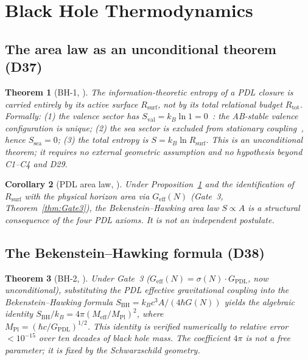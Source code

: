 \documentclass[11pt,a4paper]{article}
\theoremstyle{plain}
\newtheorem{theorem}{Theorem}[section]
\newtheorem{corollary}[theorem]{Corollary}
\theoremstyle{definition}
\theoremstyle{remark}
\newcommand{\Geff}{G_{\mathrm{eff}}}
\newcommand{\GPDL}{G_{\mathrm{PDL}}}
\newcommand{\Rsurf}{R_{\mathrm{surf}}}
\newcommand{\Rtot}{R_{\mathrm{tot}}}
\newcommand{\sigmaN}{\sigma(N)}
\newcommand{\SBH}{S_{\mathrm{BH}}}
\newcommand{\Meff}{M_{\mathrm{eff}}}
\newcommand{\MPl}{M_{\mathrm{Pl}}}
\begin{document}
\section{Black Hole Thermodynamics}
\label{sec:bh}

\subsection{The area law as an unconditional theorem (D37)}
\label{subsec:bharea}
\begin{theorem}[BH-1, \cite{D37}]
\label{thm:BH1}
The information-theoretic entropy of a PDL closure is carried entirely by its active surface $\Rsurf$, not by its total relational budget $\Rtot$. Formally: (1) the valence sector has $S_{\mathrm{val}}=k_B\ln 1=0$~\cite{D29}: the AB-stable valence configuration is unique; (2) the sea sector is excluded from stationary coupling~\cite{D29}, hence $S_{\mathrm{sea}}=0$; (3) the total entropy is $S=k_B\ln\Rsurf$. This is an unconditional theorem; it requires no external geometric assumption and no hypothesis beyond C1--C4 and D29.
\end{theorem}

\begin{corollary}[PDL area law, \cite{D37}]
\label{cor:arealaw}
Under Proposition~\ref{thm:BH1} and the identification of $\Rsurf$ with the physical horizon area via $\Geff(N)$ (Gate~3, Theorem~\ref{thm:Gate3}), the Bekenstein--Hawking area law $S\propto A$ is a structural consequence of the four PDL axioms. It is not an independent postulate.
\end{corollary}

\subsection{The Bekenstein--Hawking formula (D38)}
\label{subsec:bhformula}
\begin{theorem}[BH-2, \cite{D38}]
\label{thm:BH2}
Under Gate~3 ($G_{\mathrm{eff}}(N)=\sigmaN\cdot\GPDL$, now unconditional), substituting the PDL effective gravitational coupling into the Bekenstein--Hawking formula $\SBH=k_Bc^3A/(4\hbar G(N))$ yields the algebraic identity $\SBH/k_B=4\pi(\Meff/\MPl)^2$, where \\ $\MPl=(\hbar c/G_{\mathrm{PDL}})^{1/2}$. This identity is verified numerically to relative error $<10^{-15}$ over ten decades of black hole mass. The coefficient $4\pi$ is not a free parameter; it is fixed by the Schwarzschild geometry.
\end{theorem}
\end{document}
